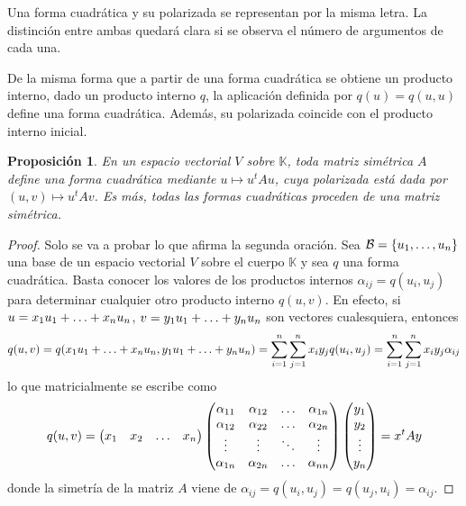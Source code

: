 \documentclass[12pt]{report}
\newtheorem{proposition}{Proposición}[chapter]
\theoremstyle{definition}
\theoremstyle{definition}
\theoremstyle{remark}
\begin{document}
Una forma cuadrática y su polarizada se representan por la misma letra. La distinción entre ambas quedará clara si se observa el número de argumentos de cada una.

\vspace{2mm}
De la misma forma que a partir de una forma cuadrática se obtiene un producto interno, dado un producto interno $q$, la aplicación definida por $q(u) = q(u,u)$ define una forma cuadrática. Además, su polarizada coincide con el producto interno inicial.

\begin{proposition}
En un espacio vectorial $V$ sobre $\mathbb{K}$, toda matriz simétrica $A$ define una forma cuadrática mediante $u \mapsto u^tAu$, cuya polarizada está dada por $(u,v) \mapsto u^tAv$. Es más, todas las formas cuadráticas proceden de una matriz simétrica.  
\end{proposition}
\begin{proof}
Solo se va a probar lo que afirma la segunda oración. Sea $\mathcal{B} = \{u_1,\mathellipsis,u_n\}$ una base de un espacio vectorial $V$ sobre el cuerpo $\mathbb{K}$ y sea $q$ una forma cuadrática. Basta conocer los valores de los productos internos $\alpha_{ij} = q(u_i,u_j)$ para determinar cualquier otro producto interno $q(u,v)$. En efecto, si $u = x_1u_1+\mathellipsis+x_nu_n$, $v = y_1 u_1+\mathellipsis+y_n u_n$ son vectores cualesquiera, entonces
\[q(u,v) = q(x_1u_1+\mathellipsis+x_nu_n,y_1 u_1+\mathellipsis+y_n u_n) = \sum_{i=1}^n\sum_{j=1}^nx_iy_jq(u_i,u_j) = \sum_{i=1}^n\sum_{j=1}^nx_iy_j\alpha_{ij}\]
lo que matricialmente se escribe como
\[q(u,v)= \begin{pmatrix*}[r]
    x_1 & x_2 & \mathellipsis & x_n
\end{pmatrix*} \begin{pmatrix*}
    \alpha_{11} & \alpha_{12} & \mathellipsis & \alpha_{1n} \\
    \alpha_{12} & \alpha_{22} & \mathellipsis & \alpha_{2n} \\
    \vdots & \vdots & \ddots & \vdots \\
    \alpha_{1n} & \alpha_{2n} & \mathellipsis & \alpha_{nn}
\end{pmatrix*} \begin{pmatrix*}
    y_1 \\
    y_2 \\
    \vdots \\
    y_n
\end{pmatrix*} = x^tAy\]
donde la simetría de la matriz $A$ viene de $\alpha_{ij} = q(u_i,u_j) = q(u_j,u_i) = \alpha_{ij}$.
\end{proof}
\end{document}
